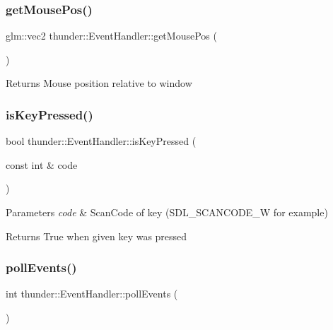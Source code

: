 \subsubsection{\texorpdfstring{get\+Mouse\+Pos()}{getMousePos()}}
{\footnotesize\ttfamily glm\+::vec2 thunder\+::\+Event\+Handler\+::get\+Mouse\+Pos (\begin{DoxyParamCaption}{ }\end{DoxyParamCaption})}

\begin{DoxyReturn}{Returns}
Mouse position relative to window 
\end{DoxyReturn}
\mbox{\label{classthunder_1_1_event_handler_ac13e94d30a9a40d7a8169d86403694df}} 
\subsubsection{\texorpdfstring{is\+Key\+Pressed()}{isKeyPressed()}}
{\footnotesize\ttfamily bool thunder\+::\+Event\+Handler\+::is\+Key\+Pressed (\begin{DoxyParamCaption}\item[{const int \&}]{code }\end{DoxyParamCaption})}


\begin{DoxyParams}{Parameters}
{\em code} & Scan\+Code of key (S\+D\+L\+\_\+\+S\+C\+A\+N\+C\+O\+D\+E\+\_\+W for example) \\
\hline
\end{DoxyParams}
\begin{DoxyReturn}{Returns}
True when given key was pressed 
\end{DoxyReturn}
\mbox{\label{classthunder_1_1_event_handler_a5eecf4f8169fadcdff0c378b45a492cf}} 
\subsubsection{\texorpdfstring{poll\+Events()}{pollEvents()}}
{\footnotesize\ttfamily int thunder\+::\+Event\+Handler\+::poll\+Events (\begin{DoxyParamCaption}{ }\end{DoxyParamCaption})}

